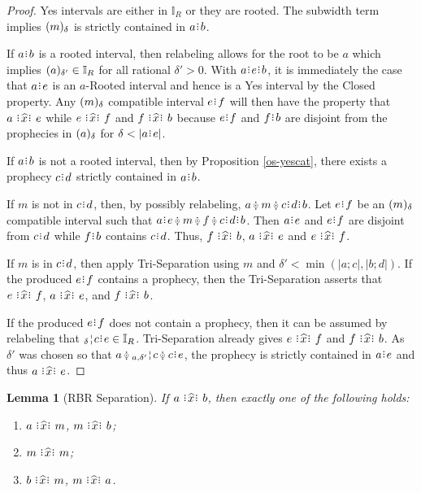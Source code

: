 \documentclass[12pt]{article}
\newtheorem{lemma}{Lemma}[section]
\begin{document}
\begin{proof}
    Yes intervals are either in $\mathbb{I}_R$ or they are rooted. The subwidth term implies $\halo{m}$ is strictly contained in $a\rint b$. 
    
    If $a \rint b$ is a rooted interval, then relabeling allows for the root to be $a$ which implies $\halo[\delta']{a} \in \mathbb{I}_R$ for all rational $\delta' >0$. With $a\rint e\rint b$, it is immediately the case that $a\rint e$ is an $a$-Rooted interval and hence is a Yes interval by the Closed property. Any $\halo{m}$ compatible interval $e\rint f$ will then have the property that $a \xora e$ while \sout{$e\xora f$} and \sout{$f\xora b$} because $e\rint f$ and $f\rint b$ are disjoint from the prophecies in $\halo{a}$ for $\delta < |a\rint e|$.
 
    If $a \rint b$ is not a rooted interval, then by Proposition \ref{os-yescat}, there exists a prophecy $c \rint d$ strictly contained in $a \rint b$. 
    
    If $m$ is not in $c\rint d$, then, by possibly relabeling, $a\betneq m \betneq c\rint d\rint b$.  Let $e\rint f$ be an $\halo{m}$ compatible interval such that $a\rint e\betneq m\betneq f \betneq c\rint d\rint b$. Then $a\rint e$ and $e\rint f$ are disjoint from $c\rint d$ while $f\rint b$ contains $c\rint d$. Thus, $f \xora b$, \sout{$a\xora e$} and \sout{$e\xora f$}.

    If $m$ is in $c\rint d$, then apply Tri-Separation using $m$ and  $\delta' < \min(|a;c|, |b;d|)$.  If the produced $e\rint f$ contains a prophecy, then the Tri-Separation asserts that  $e \xora f$, \sout{$a\xora e$}, and \sout{$f\xora b$}. 
    
    If the produced $e\rint f$ does not contain a prophecy, then  it can be assumed by relabeling that $\fuzbleft[\delta]{c}\rint e \in \mathbb{I}_R$. Tri-Separation already gives \sout{$e\xora f$} and \sout{$f\xora b$}. As $\delta'$ was chosen so that $a \betneq \fuzbleft[a, \delta']{c} \betneq c \rint e$, the prophecy is strictly contained in $a\rint e$ and thus $a \xora e$. 

\end{proof}

\begin{lemma}[RBR Separation]\label{os-intsep}
  If $a \xora b$, then exactly one of the following holds:  
  \begin{enumerate}
        \item $a\xora m$, \sout{$m \xora b$};
        \item $m \xora m$; 
        \item $b \xora m$, \sout{$m \xora a$}.
    \end{enumerate}
\end{lemma}
\end{document}
